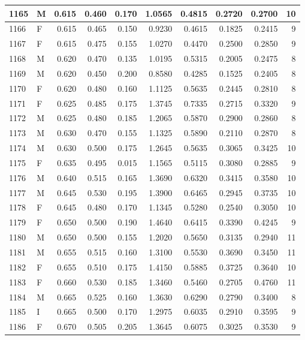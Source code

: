 \documentclass[9pt,twocolumn,twoside,]{pnas-new}
\begin{document}
\begin{tabular}{l|l|r|r|r|r|r|r|r|r}
\hline
1165 & M & 0.615 & 0.460 & 0.170 & 1.0565 & 0.4815 & 0.2720 & 0.2700 & 10\\
\hline
1166 & F & 0.615 & 0.465 & 0.150 & 0.9230 & 0.4615 & 0.1825 & 0.2415 & 9\\
\hline
1167 & F & 0.615 & 0.475 & 0.155 & 1.0270 & 0.4470 & 0.2500 & 0.2850 & 9\\
\hline
1168 & M & 0.620 & 0.470 & 0.135 & 1.0195 & 0.5315 & 0.2005 & 0.2475 & 8\\
\hline
1169 & M & 0.620 & 0.450 & 0.200 & 0.8580 & 0.4285 & 0.1525 & 0.2405 & 8\\
\hline
1170 & F & 0.620 & 0.480 & 0.160 & 1.1125 & 0.5635 & 0.2445 & 0.2810 & 8\\
\hline
1171 & F & 0.625 & 0.485 & 0.175 & 1.3745 & 0.7335 & 0.2715 & 0.3320 & 9\\
\hline
1172 & M & 0.625 & 0.480 & 0.185 & 1.2065 & 0.5870 & 0.2900 & 0.2860 & 8\\
\hline
1173 & M & 0.630 & 0.470 & 0.155 & 1.1325 & 0.5890 & 0.2110 & 0.2870 & 8\\
\hline
1174 & M & 0.630 & 0.500 & 0.175 & 1.2645 & 0.5635 & 0.3065 & 0.3425 & 10\\
\hline
1175 & F & 0.635 & 0.495 & 0.015 & 1.1565 & 0.5115 & 0.3080 & 0.2885 & 9\\
\hline
1176 & M & 0.640 & 0.515 & 0.165 & 1.3690 & 0.6320 & 0.3415 & 0.3580 & 10\\
\hline
1177 & M & 0.645 & 0.530 & 0.195 & 1.3900 & 0.6465 & 0.2945 & 0.3735 & 10\\
\hline
1178 & F & 0.645 & 0.480 & 0.170 & 1.1345 & 0.5280 & 0.2540 & 0.3050 & 10\\
\hline
1179 & F & 0.650 & 0.500 & 0.190 & 1.4640 & 0.6415 & 0.3390 & 0.4245 & 9\\
\hline
1180 & M & 0.650 & 0.500 & 0.155 & 1.2020 & 0.5650 & 0.3135 & 0.2940 & 11\\
\hline
1181 & M & 0.655 & 0.515 & 0.160 & 1.3100 & 0.5530 & 0.3690 & 0.3450 & 11\\
\hline
1182 & F & 0.655 & 0.510 & 0.175 & 1.4150 & 0.5885 & 0.3725 & 0.3640 & 10\\
\hline
1183 & F & 0.660 & 0.530 & 0.185 & 1.3460 & 0.5460 & 0.2705 & 0.4760 & 11\\
\hline
1184 & M & 0.665 & 0.525 & 0.160 & 1.3630 & 0.6290 & 0.2790 & 0.3400 & 8\\
\hline
1185 & I & 0.665 & 0.500 & 0.170 & 1.2975 & 0.6035 & 0.2910 & 0.3595 & 9\\
\hline
1186 & F & 0.670 & 0.505 & 0.205 & 1.3645 & 0.6075 & 0.3025 & 0.3530 & 9\\

\end{tabular}
\end{document}
